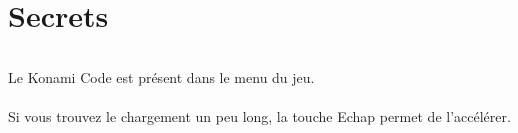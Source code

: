 \documentclass[titlepage, 13px, a4paper]{report}
\begin{document}


\part{Secrets} 
\paragraph*{} \hspace{0pt}
Le Konami Code est présent dans le menu du jeu. \\ \\
Si vous trouvez le chargement un peu long, la touche Echap permet de l'accélérer. \\


\end{document}
